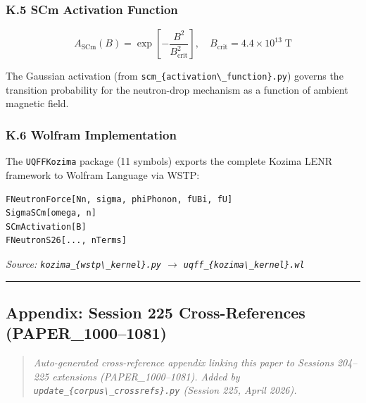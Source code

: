 \documentclass[
  11pt,
]{article}
\begin{document}
\subsubsection{K.5 SCm Activation
Function}\label{k.5-scm-activation-function}

\[A_{\mathrm{SCm}}(B) = \exp\!\left[-\frac{B^2}{B_{\mathrm{crit}}^2}\right], \quad B_{\mathrm{crit}} = 4.4 \times 10^{13} \;\text{T}\]

The Gaussian activation (from
\texttt{scm\_\{activation\textbackslash{}\_function\}.py}) governs the
transition probability for the neutron-drop mechanism as a function of
ambient magnetic field.

\subsubsection{K.6 Wolfram
Implementation}\label{k.6-wolfram-implementation}

The \texttt{UQFFKozima} package (11 symbols) exports the complete Kozima
LENR framework to Wolfram Language via WSTP:

\begin{verbatim}
FNeutronForce[Nn, sigma, phiPhonon, fUBi, fU]
SigmaSCm[omega, n]
SCmActivation[B]
FNeutronS26[..., nTerms]
\end{verbatim}

\emph{Source: \texttt{kozima\_\{wstp\textbackslash{}\_kernel\}.py}
$\to$ \texttt{uqff\_\{kozima\textbackslash{}\_kernel\}.wl}}

\begin{center}\rule{0.5\linewidth}{0.5pt}\end{center}

\subsection{Appendix: Session 225 Cross-References
(PAPER\_1000--1081)}\label{appendix-session-225-cross-references-paper_10001081}

\begin{quote}
\emph{Auto-generated cross-reference appendix linking this paper to
Sessions 204--225 extensions (PAPER\_1000--1081). Added by
\texttt{update\_\{corpus\textbackslash{}\_crossrefs\}.py} (Session 225,
April 2026).}
\end{quote}
\end{document}
